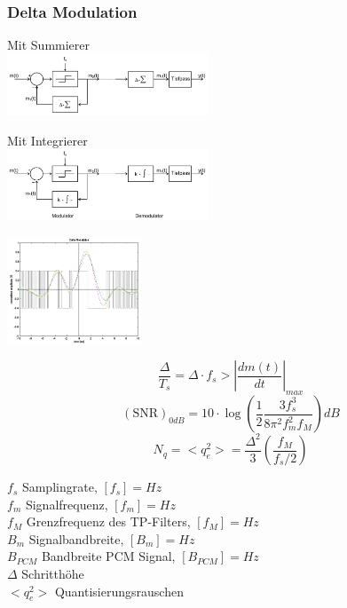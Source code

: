 \subsubsection{Delta Modulation }
\begin{minipage}{6cm}
	Mit Summierer\\
\includegraphics[width = 6cm]{bilder/dig_delta_modulator_schema_sum}
\end{minipage}
\hspace{0.5cm}
\begin{minipage}{6cm}
	Mit Integrierer\\
	\includegraphics[width = 6cm] {bilder/dig_delta_modulator_schema_int}
\end{minipage}
\hspace{0.5cm}
\begin{minipage}{4cm}
\includegraphics[width = 4cm] {bilder/dig_delta_modulation}
\end{minipage}

\begin{minipage}{9cm}
$$ \frac{\Delta}{T_s} = \Delta \cdot f_s > \left| \frac{d m(t)}{dt} \right|_{max}$$
$$ (\text{SNR})_{0dB} = 10 \cdot \log\left(\frac{1}{2}\frac{3 f_s^3}{8 \pi^2 f_m^2 f_M}\right) dB$$ 
$$ N_q = <q_e^2> = \frac{\Delta^2}{3}\left(\frac{f_M}{f_s/2} \right) $$ 
\end{minipage}
\begin{minipage}{9cm}
	$f_s$ Samplingrate, $[f_s] = Hz$ \\
	$f_m$ Signalfrequenz, $[f_m] = Hz$ \\
	$f_M$ Grenzfrequenz des TP-Filters, $[f_M] = Hz$ \\
	$B_m$ Signalbandbreite, $[B_m] = Hz $ \\
	$B_{PCM}$ Bandbreite PCM Signal, $[B_{PCM}] = Hz $\\
	$\Delta$ Schritthöhe\\
	$<q_e^2>$ Quantisierungsrauschen \\
\end{minipage}

